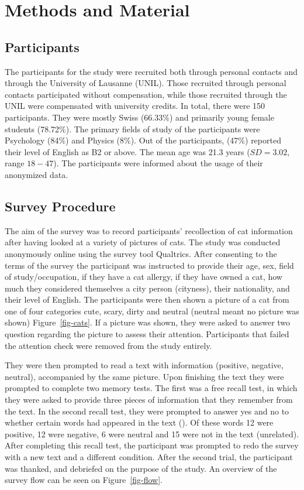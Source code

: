 \documentclass[
  man,
  longtable,
  nolmodern,
  notxfonts,
  notimes,
  colorlinks=true,linkcolor=blue,citecolor=blue,urlcolor=blue]{apa7}
\begin{document}
\section{Methods and Material}\label{methods-and-material}

\subsection{Participants}\label{participants}

The participants for the study were recruited both through personal
contacts and through the University of Lausanne (UNIL). Those recruited
through personal contacts participated without compensation, while those
recruited through the UNIL were compensated with university credits. In
total, there were 150 participants. They were mostly Swiss (66.33\%) and
primarily young female students (78.72\%). The primary fields of study
of the participants were Psychology (84\%) and Physics (8\%). Out of the
participants, (47\%) reported their level of English as B2 or above. The
mean age was 21.3 years (\(SD = 3.02\), range \(18-47\)). The
participants were informed about the usage of their anonymized data.

\subsection{Survey Procedure}\label{survey-procedure}

The aim of the survey was to record participants' recollection of cat
information after having looked at a variety of pictures of cats. The
study was conducted anonymously online using the survey tool Qualtrics.
After consenting to the terms of the survey the participant was
instructed to provide their age, sex, field of study/occupation, if they
have a cat allergy, if they have owned a cat, how much they considered
themselves a city person (cityness), their nationality, and their level
of English. The participants were then shown a picture of a cat from one
of four categories cute, scary, dirty and neutral (neutral meant no
picture was shown) Figure~\ref{fig-cats}. If a picture was shown, they
were asked to answer two question regarding the picture to assess their
attention. Participants that failed the attention check were removed
from the study entirely.

They were then prompted to read a text with information (positive,
negative, neutral), accompanied by the same picture. Upon finishing the
text they were prompted to complete two memory tests. The first was a
free recall test, in which they were asked to provide three pieces of
information that they remember from the text. In the second recall test,
they were prompted to answer yes and no to whether certain words had
appeared in the text
(). Of these words 12 were positive, 12 were negative, 6 were
neutral and 15 were not in the text (unrelated). After completing this
recall test, the participant was prompted to redo the survey with a new
text and a different condition. After the second trial, the participant
was thanked, and debriefed on the purpose of the study. An overview of
the survey flow can be seen on Figure~\ref{fig-flow}.
\end{document}
